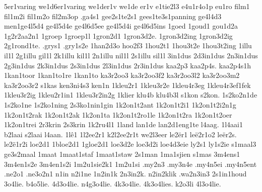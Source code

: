 {5er1varing
we1d6er1varing
we1der1v
we1de
er1v
%
e1tie2l3
%
e4u1r4o1p
eu1ro
%
film1
fil1m2i
fil1m2o
fil2m3op
%
.ga4s1
%
gee2s1te2s1
gees1te3s1panning
%
ge4l4d3
men1ge4l5d4
ge4l5d4e
ge4l6d5ee
ge4l5d4i
ge4l6d5ins
%
%
1goed
%
1goud1
gou1d2a
%
1g2r2aa2n1
%
1groep
1groep1l
%
1gron2d1
1gron3d2e.
1gron3d2ing
1gron3d2ig
2g1rond1te.
%
.grys1
.gry1s2e
%
1han2d3o
%
hoo2f3
%
1hou2t1
1hou3t2e
1hou3t2ing
%
1illu
il1l
2g1illu
gil1l
2k1illu
kil1l
2n1illu
nil1l
2s1illu
sil1l
%
3in1dus
2d3in1dus
2n3in1dus
2g3in1dus
2k3in1dus
2s3in1dus
2l3in1dus
2r3in1dus
%
kaa2p3
kaa2p4s.
kaa2p4s1h
%
1kan1toor
1kan1to1re
1kan1to
%
ka3r2oo3
ka3r2oo3f2
ka3r2oo3l2
ka3r2oo3m2
ka3r2oo3r2
%
s1kas
%
ken3ni4s3
ken1n
%
1kleu2r1
1kleu3r2e
1kleu4r3eg
1kleu4r3ef1fek
1kleu3r2ig
1kleu2r1in1
1kleu3r2in2g
%
1klier
%
klu4b
klu4b3l
%
s1kon
s2kon.
1s2ko2n1de
1s2ko1ne
1s2ko1ning
2s3ko1nin1gin
1k2on1t2ant
1k2on1t2i1
1k2on1t2i2n1g
1k2on1t2rak
1k2on1t2ak
1k2on1ta
1k2on1t2ro1le
1k2on1t2ra
1k2on1t2oer
1k2on1trei
%
2r3krin
2s3krin
%
1k2ru4l1
%
1land
lan1de
lan2d1eng1te
%
l4aag.
1l4aai1
b2laai
s2laai
l4aan.
%
1lê1
%
1l2ee2r1
k2l2ee2r1t
we2l3eer
%
le2ër1
leë2r1o2
leër2s.
le2ë1r2i
%
loe2d1
1bloe2d1
1gloe2d1
loe3d2e
loe3d2i
loe4d3eie
%
ly2s1
ly1s2ie
%
s1maal3
ge3s2maal
%
1maat
1maat1staf
1maat1staw
%
2s1man
%
1ma1sjien
s1mas
%
%
3m4ens1
3m4en1s2e
3m4en1s2i
%
1m2u1sie2k1
1m2u1si
%
.my2n3
.my3n4e
.my4n5ei
.my4n5ent
%
.ne2o1
.ne3o2n1
%
n1in
n2i1ne
1n2in1k
2n3in2k.
n2in2klik
%
.wa2n3in3
2s1in1houd
%
3o4lie.
b4o5lie.
4d3o4lie.
n4g3o4lie.
4k3o4lie.
4k3o4lies.
k2o3li
4l3o4lie.
}
